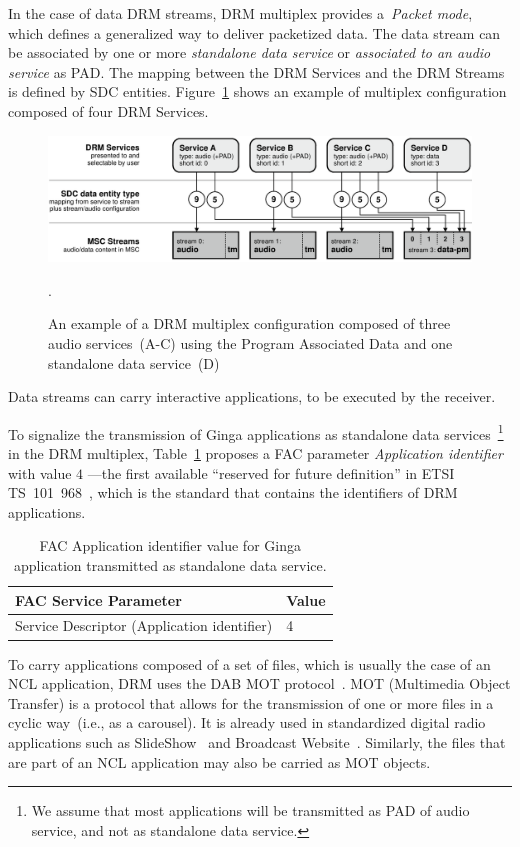 \documentclass[11pt]{article}
\begin{document}
In the case of data DRM streams, DRM multiplex provides a~\emph{Packet
  mode}, which defines a generalized way to deliver packetized data. The
data stream can be associated by one or more \emph{standalone data service}
or \emph{associated to an audio service} as PAD. The mapping between the
DRM Services and the DRM Streams is defined by SDC entities.
Figure~\ref{figuredrm} shows an example of multiplex configuration composed of
four DRM Services.

\begin{figure}[H]
  \centering
  \includegraphics[scale=0.3]{images/drm-system.png}
  \caption{An example of a DRM multiplex configuration composed of three audio
           services~(A-C) using the Program Associated Data and one standalone
           data service~(D)}.
  \label{figuredrm}
\end{figure}

Data streams can carry interactive applications, to be executed by the
receiver.

To signalize the transmission of Ginga applications as standalone data
services~\footnote{We
  assume that most applications will be transmitted as PAD of audio service,
  and not as standalone data service.}
in the DRM multiplex, Table~\ref{tablefac} proposes a FAC parameter
\emph{Application identifier} with value $4$ ---the first available
``reserved for future definition'' in ETSI TS~101~968~\cite{ETSI-101968-2009},
which is the standard that contains the identifiers of DRM applications.

\begin{table}[H]
\centering
\caption{FAC Application identifier value for Ginga application transmitted as
  standalone data service.}
\label{tablefac}
\begin{tabular}{|l|l|}
  \hline
  FAC Service Parameter & Value \\
  \hline
  Service Descriptor (Application identifier) & 4 \\
  \hline
\end{tabular}
\end{table}

To carry applications composed of a set of files, which is usually the
case of an NCL application, DRM uses the DAB MOT
protocol~\cite{ETSI-301234-2006}. MOT (Multimedia Object Transfer) is a
protocol that allows for the transmission of one or more files in a cyclic
way~(i.e., as a carousel).
It is already used in standardized digital radio applications such as
SlideShow~\cite{ETSI-101499-2015} and Broadcast
Website~\cite{ETSI-101498-1-2006}. Similarly, the files that are part of an
NCL application may also be carried as MOT objects.
\end{document}
